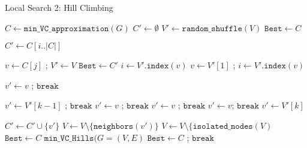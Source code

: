 \documentclass{sig-alternate-05-2015}
\begin{document}
\begin{algorithm}
\LinesNumbered
\DontPrintSemicolon
\BlankLine
 

\caption{Local Search 2: Hill Climbing}

\BlankLine
\Begin
{
	$C \leftarrow \texttt{min\_VC\_approximation}(G)$\;
	$C' \leftarrow \emptyset$\;
	$V' \leftarrow \texttt{random\_shuffle}(V)$\;
	$\texttt{Best} \leftarrow C$\;
	{
		$C' \leftarrow C [ i .. |C|]$\;
		\ForAll{$ j \in [i,|C'|$}
		{
			$v \leftarrow C[j]$ ; $V' \leftarrow V$\;
			{
				$\texttt{Best} \leftarrow C'$\;
			}
			{
				$i \leftarrow V'.\texttt{index}(v)$\;
			}
			{
				$v \leftarrow V'[1]$ ; $i \leftarrow V'.\texttt{index}(v)$\;
							}
			\ForAll{$k \in [i,|V'|$}
			{
				{
					$v' \leftarrow v$ ; $\texttt{break}$\;
					
				}
				{
					{
						$v' \leftarrow V'[k-1]$ ; $\texttt{break}$\;			
					}
					{
						$v' \leftarrow v$ ; $\texttt{break}$\;				
					}
				{
					$v' \leftarrow v$ ; $\texttt{break}$\;					
				}
				{
					$v' \leftarrow v$; $\texttt{break}$\;
				}
				\Else{}
				{
					$v' \leftarrow V'[k]$\;
				}
			}
		}
		$C' \leftarrow C' \cup \lbrace v' \rbrace$\;
		$V \leftarrow V \setminus \lbrace \texttt{neighbors}(v') \rbrace$\;
		$V \leftarrow V \setminus \lbrace \texttt{isolated\_nodes}(V)$\;
		{
			{
				$\texttt{Best} \leftarrow C$\;
			}
			{
				$\texttt{min\_VC\_Hills}(G=(V,E)$\;
			}
		}
		{
			$\texttt{Best} \leftarrow C$ ; $\texttt{break}$\;
		}
	}
	}
	\;
}
\end{algorithm}
\end{document}

